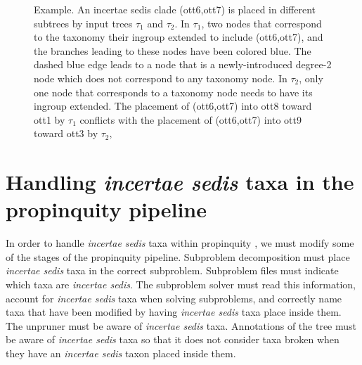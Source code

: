 \documentclass[english]{article}
\begin{document}
\begin{figure}


\caption{\label{fig:placement-example1}Example.
    An incertae sedis clade (ott6,ott7)
    is placed in different subtrees by input trees $\tau_{1}$ and $\tau_{2}$.
    In $\tau_{1}$, two nodes that correspond to the taxonomy their ingroup
    extended to include (ott6,ott7), and the branches leading to these
    nodes have been colored blue.
    The dashed blue edge leads to a node
    that is a newly-introduced degree-2 node which does not correspond
    to any taxonomy node.
    In $\tau_{2}$, only one node that corresponds
    to a taxonomy node needs to have its ingroup extended.
    The placement
    of (ott6,ott7) into ott8 toward ott1 by $\tau_{1}$ conflicts with
    the placement of (ott6,ott7) into ott9 toward ott3 by $\tau_{2},$}
\end{figure}





\section{Handling \emph{incertae sedis} taxa in the propinquity
pipeline}

In order to handle \emph{incertae sedis} taxa within propinquity \citep{redelings2017supertree}, we
must modify some of the stages of the propinquity pipeline.
Subproblem
decomposition must place \emph{incertae sedis} taxa in the correct
subproblem.
Subproblem files must indicate which taxa are \emph{incertae sedis}.
The subproblem solver must read this information, account for
\emph{incertae sedis} taxa when solving subproblems, and correctly
name taxa that have been modified by having \emph{incertae sedis} taxa
place inside them.
The unpruner must be aware of \emph{incertae sedis}
taxa.
Annotations of the tree must be aware of \emph{incertae sedis}
taxa so that it does not consider taxa broken when they have an
\emph{incertae sedis} taxon placed inside them.
\end{document}
